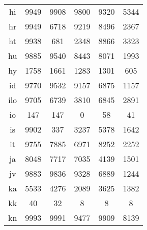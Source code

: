 \begin{figure}[h]
\begin{tabular}{cccccc}
hi&9949&9908&9800&9320&5344\\
hr&9949&6718&9219&8496&2367\\
ht&9938&681&2348&8866&3323\\
hu&9885&9540&8443&8071&1993\\
hy&1758&1661&1283&1301&605\\
id&9770&9532&9157&6875&1157\\
ilo&9705&6739&3810&6845&2891\\
io&147&147&0&58&41\\
is&9902&337&3237&5378&1642\\
it&9755&7885&6971&8252&2252\\
ja&8048&7717&7035&4139&1501\\
jv&9883&9836&9328&6889&1244\\
ka&5533&4276&2089&3625&1382\\
kk&40&32&8&8&8\\
kn&9993&9991&9477&9909&8139\\
\end{tabular}
\end{figure}
\clearpage
